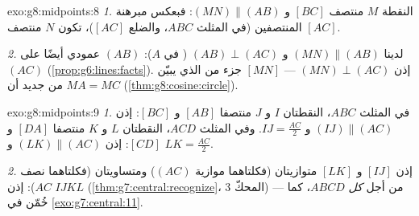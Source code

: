 \begin{solution}{exo:g8:midpoints:8}
\emph{1.} النقطة $M$ منتصف $[BC]$ و $(MN) \parallel (AB)$:
فبعكس مبرهنة المنتصفين (في المثلث $ABC$،
والضلع $[AC]$)، تكون $N$ منتصف $[AC]$.

\emph{2.} لدينا $(MN) \parallel (AB)$ و $(AB) \perp (AC)$ (
في $A$):    $(AB)$ عمودي أيضًا على $(AC)$
(\cref{prop:g6:lines:facts}). إذن $(MN) \perp (AC)$ --- 
$[MN]$ جزء من  الذي يبيّن من جديد أن
$MA = MC$ (\cref{thm:g8:cosine:circle}).
\end{solution}

\begin{solution}{exo:g8:midpoints:9}
\emph{1.} في المثلث $ABC$، النقطتان $I$ و $J$ منتصفا $[AB]$ و
$[BC]$: إذن $(IJ) \parallel (AC)$ و $IJ = \frac{AC}{2}$. وفي المثلث
$ACD$، النقطتان $L$ و $K$ منتصفا $[DA]$ و $[CD]$:
إذن $(LK) \parallel (AC)$ و $LK = \frac{AC}{2}$.

\emph{2.} إذن $[IJ]$ و $[LK]$ متوازيتان (فكلتاهما موازية
 $(AC)$) ومتساويتان (فكلتاهما نصف $AC$): إذن $IJKL$
 (\cref{thm:g7:central:recognize}، المحكّ 3) ---
من أجل \emph{كل}  $ABCD$، كما خُمّن في
\cref{exo:g7:central:11}.
\end{solution}

